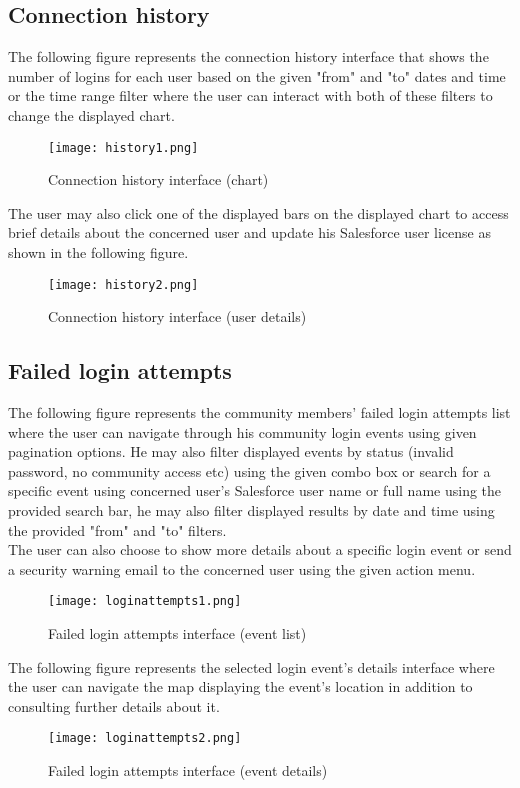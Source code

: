 \subsection{Connection history}
The following figure represents the connection history interface that shows the number of logins for each user based on the given "from" and "to" dates and time or the time range filter where the user can interact with both of these filters to change the displayed chart.  
\begin{figure}[H]%
    \center   
    
    \texttt{[image: history1.png]}
    \caption{Connection history interface (chart)}
\end{figure}
The user may also click one of the displayed bars on the displayed chart to access brief details about the concerned user and update his Salesforce user license as shown in the following figure.
\begin{figure}[H]%
    \center   
    
    \texttt{[image: history2.png]}
    \caption{Connection history interface (user details)}
\end{figure}
\subsection{Failed login attempts}
The following figure represents the community members' failed login attempts list where the user can navigate through his community login events using given pagination options. He may also filter displayed events by status (invalid password, no community access etc) using the given combo box or search for a specific event using concerned user's Salesforce user name or full name using the provided search bar, he may also filter displayed results by date and time using the provided "from" and "to" filters.\\
The user can also choose to show more details about a specific login event or send a security warning email to the concerned user using the given action menu.

\begin{figure}[H]%
    \center   
    
    \texttt{[image: loginattempts1.png]}
    \caption{Failed login attempts interface (event list)}
\end{figure}
The following figure represents the selected login event's details interface where the user can navigate the map displaying the event's location in addition to consulting further details about it.
 \begin{figure}[H]%
    \center   
    
    \texttt{[image: loginattempts2.png]}
    \caption{Failed login attempts interface (event details)}
\end{figure}
